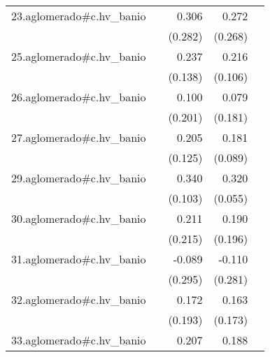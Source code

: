 {\begin{longtable}{l*{4}{D{.}{.}{-1}}}
\addlinespace
23.aglomerado#c.hv\_banio&                     &       0.306         &       0.272         &                     \\
            &                     &     (0.282)         &     (0.268)         &                     \\
\addlinespace
25.aglomerado#c.hv\_banio&                     &       0.237         &       0.216\sym{*}  &                     \\
            &                     &     (0.138)         &     (0.106)         &                     \\
\addlinespace
26.aglomerado#c.hv\_banio&                     &       0.100         &       0.079         &                     \\
            &                     &     (0.201)         &     (0.181)         &                     \\
\addlinespace
27.aglomerado#c.hv\_banio&                     &       0.205         &       0.181\sym{*}  &                     \\
            &                     &     (0.125)         &     (0.089)         &                     \\
\addlinespace
29.aglomerado#c.hv\_banio&                     &       0.340\sym{***}&       0.320\sym{***}&                     \\
            &                     &     (0.103)         &     (0.055)         &                     \\
\addlinespace
30.aglomerado#c.hv\_banio&                     &       0.211         &       0.190         &                     \\
            &                     &     (0.215)         &     (0.196)         &                     \\
\addlinespace
31.aglomerado#c.hv\_banio&                     &      -0.089         &      -0.110         &                     \\
            &                     &     (0.295)         &     (0.281)         &                     \\
\addlinespace
32.aglomerado#c.hv\_banio&                     &       0.172         &       0.163         &                     \\
            &                     &     (0.193)         &     (0.173)         &                     \\
\addlinespace
33.aglomerado#c.hv\_banio&                     &       0.207\sym{*}  &       0.188\sym{***}&                     \\

\end{longtable}}

